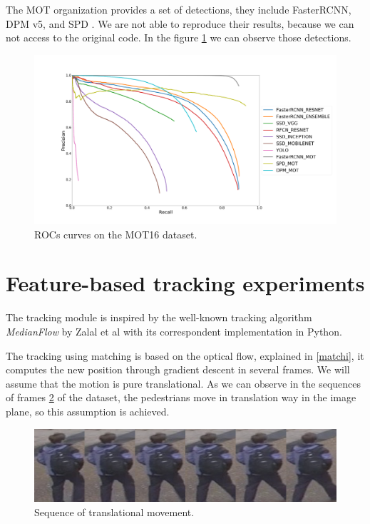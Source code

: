 The MOT organization provides a set of detections, they include FasterRCNN, DPM v5, and SPD \cite{spd}. We are not able to reproduce their results, because we can not access to the original code. In the figure \ref{experimDet3} we can observe those detections.




\begin{figure}[H]
\centering         
\includegraphics[width=0.9\linewidth]{evaluacionObject/motdetece.png}
\caption{ROCs curves on the MOT16 dataset.} \label{experimDet3}
\end{figure}


\section{Feature-based tracking experiments}


The tracking module is inspired by the well-known tracking algorithm \textit{MedianFlow} by Zalal et al\cite{medianFlow} with its correspondent implementation in Python\cite{medianFlowPython}.

The tracking using matching is based on the optical flow, explained in \ref{matchi}, it computes the new position through gradient descent in several frames. We will assume that the motion is pure translational. As we can observe in the sequences of frames \ref{experiTrack1} of the dataset, the pedestrians move in translation way in the image plane, so this assumption is achieved.

\begin{figure}[H]
\centering         
\includegraphics[width=0.9\linewidth]{changeCamera/tomeu.png}
\caption{Sequence of translational movement.} \label{experiTrack1}
\end{figure}

